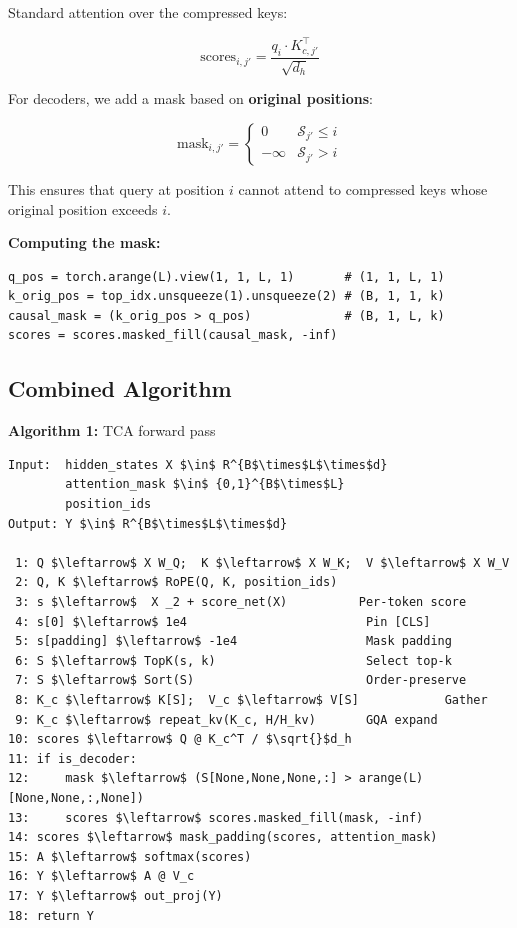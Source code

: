 Standard attention over the compressed keys:

\[
\text{scores}_{i, j'} = \frac{q_i \cdot K_{c, j'}^\top}{\sqrt{d_h}}
\tag{4.7}
\]

For decoders, we add a mask based on \textbf{original positions}:

\[
\text{mask}_{i, j'} = \begin{cases} 0 & \mathcal{S}_{j'} \leq i \\ -\infty & \mathcal{S}_{j'} > i \end{cases}
\tag{4.8}
\]

This ensures that query at position $i$ cannot attend to compressed keys 
whose original position exceeds $i$.

\textbf{Computing the mask:}

\begin{lstlisting}
q_pos = torch.arange(L).view(1, 1, L, 1)       # (1, 1, L, 1)
k_orig_pos = top_idx.unsqueeze(1).unsqueeze(2) # (B, 1, 1, k)
causal_mask = (k_orig_pos > q_pos)             # (B, 1, L, k)
scores = scores.masked_fill(causal_mask, -inf)
\end{lstlisting}

\subsection{Combined Algorithm}

\textbf{Algorithm 1:} TCA forward pass
\begin{lstlisting}
Input:  hidden_states X $\in$ R^{B$\times$L$\times$d}
        attention_mask $\in$ {0,1}^{B$\times$L}
        position_ids
Output: Y $\in$ R^{B$\times$L$\times$d}

 1: Q $\leftarrow$ X W_Q;  K $\leftarrow$ X W_K;  V $\leftarrow$ X W_V
 2: Q, K $\leftarrow$ RoPE(Q, K, position_ids)
 3: s $\leftarrow$  X _2 + score_net(X)          Per-token score
 4: s[0] $\leftarrow$ 1e4                         Pin [CLS]
 5: s[padding] $\leftarrow$ -1e4                  Mask padding
 6: S $\leftarrow$ TopK(s, k)                     Select top-k
 7: S $\leftarrow$ Sort(S)                        Order-preserve
 8: K_c $\leftarrow$ K[S];  V_c $\leftarrow$ V[S]            Gather
 9: K_c $\leftarrow$ repeat_kv(K_c, H/H_kv)       GQA expand
10: scores $\leftarrow$ Q @ K_c^T / $\sqrt{}$d_h
11: if is_decoder:
12:     mask $\leftarrow$ (S[None,None,None,:] > arange(L)[None,None,:,None])
13:     scores $\leftarrow$ scores.masked_fill(mask, -inf)
14: scores $\leftarrow$ mask_padding(scores, attention_mask)
15: A $\leftarrow$ softmax(scores)
16: Y $\leftarrow$ A @ V_c
17: Y $\leftarrow$ out_proj(Y)
18: return Y
\end{lstlisting}

